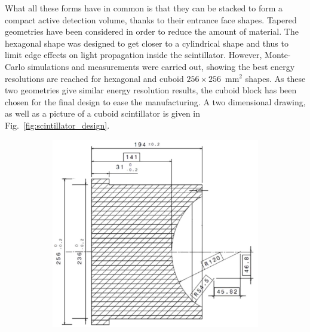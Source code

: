 What all these forms have in common is that they can be stacked to form a compact active detection volume, thanks to their entrance face shapes.
Tapered geometries have been considered in order to reduce the amount of material.
The hexagonal shape was designed to get closer to a cylindrical shape and thus to limit edge effects on light propagation inside the scintillator.
However, Monte-Carlo simulations and measurements were carried out, showing the best energy resolutions are reached for hexagonal and cuboid $256\times256$~mm$^{2}$ shapes.
As these two geometries give similar energy resolution results, the cuboid block has been chosen for the final design to ease the manufacturing.
A two dimensional drawing, as well as a picture of a cuboid scintillator is given in Fig.~\ref{fig:scintillator_design}.
\begin{figure}[!h]
  \centering
  \begin{subfigure}[t]{0.49\textwidth}
    \centering
    \includegraphics[height=0.95\textwidth]{SNdemonstrator/fig_SNdemonstrator/scintillator_plan.pdf}
  \end{subfigure}
  \hfill
  \begin{subfigure}[t]{0.49\textwidth}
    \centering

\end{subfigure}
\end{figure}
